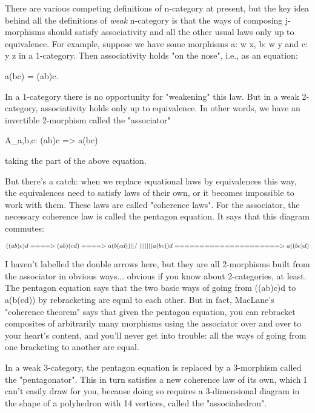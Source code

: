 There are various competing definitions of n-category at present, but
the key idea behind all the definitions of \emph{weak} n-category is that the
ways of composing j-morphisms should satisfy associativity and all the
other usual laws only up to equivalence.  For example, suppose we have
some morphisms a: w \to  x, b: w \to  y and c: y \to  z in a
1-category.  Then associativity holds "on the nose", i.e., as
an equation:

a(bc) = (ab)c.

In a 1-category there is no opportunity for "weakening" this
law.  But in a weak 2-category, associativity holds only up to
equivalence.  In other words, we have an invertible 2-morphism called
the "associator"

A_{a,b,c}: (ab)c => a(bc)

taking the part of the above equation.  

But there's a catch: when we replace equational laws by equivalences
this way, the equivalences need to satisfy laws of their own, or it
becomes impossible to work with them.  These laws are called
"coherence laws".  For the associator, the necessary coherence
law is called the pentagon equation.  It says that this diagram
commutes:

$$
               ((ab)c)d  ====>  (ab)(cd)  ====> a(b(cd))

                  ||                              /\
                  ||                              ||
                  \/                              ||

               (a(bc))d  =====================> a((bc)d)
$$
    
I haven't labelled the double arrows here, but they are all 2-morphisms
built from the associator in obvious ways... obvious if you know about
2-categories, at least.  The pentagon equation says that the two basic
ways of going from ((ab)c)d to a(b(cd)) by rebracketing are equal to
each other.  But in fact, MacLane's "coherence theorem" says
that given the pentagon equation, you can rebracket composites of
arbitrarily many morphisms using the associator over and over to your
heart's content, and you'll never get into trouble: all the ways of
going from one bracketing to another are equal.

In a weak 3-category, the pentagon equation is replaced by a 3-morphism
called the "pentagonator".  This in turn satisfies a new coherence
law of its own, which I can't easily draw for you, because doing so 
requires a 3-dimensional diagram in the shape of a polyhedron with 14
vertices, called the "associahedron".  

